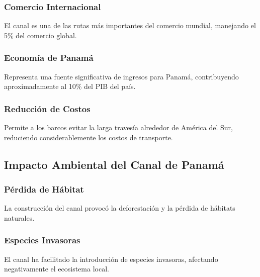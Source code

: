 \documentclass{article}
\begin{document}
\hypertarget{comercio-internacional}{%
\subsubsection{Comercio Internacional}\label{comercio-internacional}}

El canal es una de las rutas más importantes del comercio mundial,
manejando el 5\% del comercio global.

\hypertarget{economuxeda-de-panamuxe1}{%
\subsubsection{Economía de Panamá}\label{economuxeda-de-panamuxe1}}

Representa una fuente significativa de ingresos para Panamá,
contribuyendo aproximadamente al 10\% del PIB del país.

\hypertarget{reducciuxf3n-de-costos}{%
\subsubsection{Reducción de Costos}\label{reducciuxf3n-de-costos}}

Permite a los barcos evitar la larga travesía alrededor de América del
Sur, reduciendo considerablemente los costos de transporte.

\hypertarget{impacto-ambiental-del-canal-de-panamuxe1}{%
\subsection{Impacto Ambiental del Canal de
Panamá}\label{impacto-ambiental-del-canal-de-panamuxe1}}

\hypertarget{puxe9rdida-de-huxe1bitat}{%
\subsubsection{Pérdida de Hábitat}\label{puxe9rdida-de-huxe1bitat}}

La construcción del canal provocó la deforestación y la pérdida de
hábitats naturales.

\hypertarget{especies-invasoras}{%
\subsubsection{Especies Invasoras}\label{especies-invasoras}}

El canal ha facilitado la introducción de especies invasoras, afectando
negativamente el ecosistema local.
\end{document}
